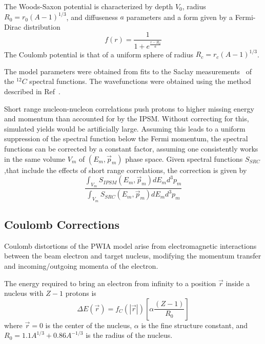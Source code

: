 The Woods-Saxon potential is characterized by
depth $V_0$,
radius $R_0=r_0(A-1)^{1/3}$, and
diffuseness $a$
parameters and a form given by a Fermi-Dirac distribution
\begin{equation}
    f(r) = \frac{1}{1+e^{\frac{r-R_0}{a}}}
\end{equation}
The Coulomb potential is that of a uniform sphere of radius
$R_c=r_c(A-1)^{1/3}$.


The model parameters were obtained from fits to the Saclay
measurements~\cite{Mougey_1976, Frullani_1984} of the ${}^{12}C$ spectral
functions.
The wavefunctions were obtained using the method described in
Ref~\cite{Giusti_1988, Giusti_1987, Blok_1991}.


Short range nucleon-nucleon correlations push protons to higher missing energy
and momentum than accounted for by the IPSM.
Without correcting for this, simulated yields would be artificially large.
Assuming this leads to a uniform suppression of the spectral function below the
Fermi momentum, the spectral functions can be corrected by a constant factor,
assuming one consistently works in the same volume $V_m$ of $(E_m,\vec{p}_m)$ phase
space.
Given spectral functions $S_{SRC}$,that include the effects of short range
correlations, the correction is given by
\begin{equation}
    \frac{\int_{V_m} S_{IPSM}(E_m,\vec{p}_m) dE_m d^3p_m}
         {\int_{V_m} S_{SRC} (E_m,\vec{p}_m) dE_m d^3p_m}
\end{equation}

\subsection{Coulomb Corrections}
Coulomb distortions of the PWIA model arise from electromagnetic interactions
between the beam electron and target nucleus, modifying the momentum transfer
and incoming/outgoing momenta of the electron.


The energy required to bring an electron from infinity to a position $\vec{r}$
inside a nucleus with $Z-1$ protons is
\begin{equation}
    \Delta E(\vec{r})=f_{C}(|\vec{r}|)\left[\alpha \frac{(Z-1)}{R_{0}}\right]
\end{equation}
where
$\vec{r}=0$ is the center of the nucleus,
$\alpha$ is the fine structure constant,
and
$R_0=1.1 A^{1/3}+0.86 A^{-1/3}$ is the radius of the nucleus.


